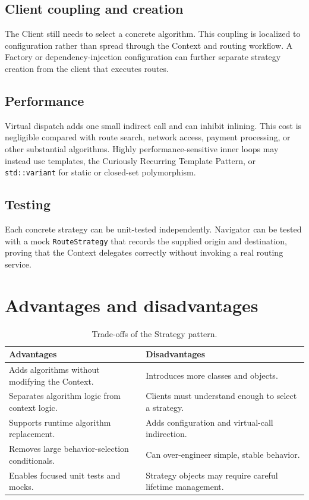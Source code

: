\documentclass[11pt,a4paper]{report}
\begin{document}
\subsection{Client coupling and creation}
The Client still needs to select a concrete algorithm. This coupling is
localized to configuration rather than spread through the Context and routing
workflow. A Factory or dependency-injection configuration can further separate
strategy creation from the client that executes routes.

\subsection{Performance}
Virtual dispatch adds one small indirect call and can inhibit inlining. This
cost is negligible compared with route search, network access, payment
processing, or other substantial algorithms. Highly performance-sensitive inner
loops may instead use templates, the Curiously Recurring Template Pattern, or
\texttt{std::variant} for static or closed-set polymorphism.

\subsection{Testing}
Each concrete strategy can be unit-tested independently. Navigator can be tested
with a mock \texttt{RouteStrategy} that records the supplied origin and
destination, proving that the Context delegates correctly without invoking a
real routing service.

\section{Advantages and disadvantages}
\begin{table}[H]
\centering
\caption{Trade-offs of the Strategy pattern.}
\begin{tabularx}{\textwidth}{@{}YY@{}}
\toprule
\textbf{Advantages} & \textbf{Disadvantages} \\
\midrule
Adds algorithms without modifying the Context. & Introduces more classes and objects. \\
Separates algorithm logic from context logic. & Clients must understand enough to select a strategy. \\
Supports runtime algorithm replacement. & Adds configuration and virtual-call indirection. \\
Removes large behavior-selection conditionals. & Can over-engineer simple, stable behavior. \\
Enables focused unit tests and mocks. & Strategy objects may require careful lifetime management. \\
\bottomrule
\end{tabularx}
\end{table}
\end{document}
